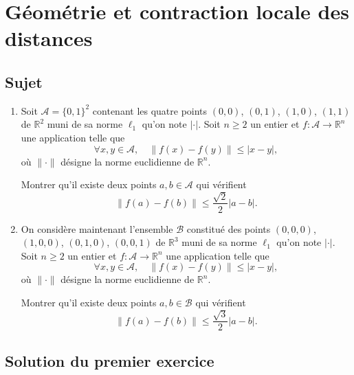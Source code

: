\chapter{Géométrie et contraction locale des distances}

\section{Sujet}

\begin{enumerate}
\item
Soit $\mathcal A = \{0,1\}^2$ contenant les quatre points $(0,0)$, $(0,1)$, $(1,0)$, $(1,1)$ de $\mathbb{R}^2$ muni de sa norme $\ell_1$ qu'on note $\lvert\cdot\rvert$. 
Soit $n\geqslant 2$ un entier et $f : \mathcal A \to \mathbb{R}^n$ une application telle que 
\[\forall x,y\in \mathcal A,\quad \lVert f(x) - f(y) \rVert \leqslant \lvert x - y \rvert,\]
où $\lVert \cdot \rVert$ désigne la norme euclidienne de $\mathbb{R}^n$.

Montrer qu'il existe deux points $a,b\in\mathcal A$ qui vérifient
\[\lVert f(a) - f(b)\rVert \leqslant \frac{\sqrt 2} 2 \lvert a - b\rvert.\]
\item 
On considère maintenant l'ensemble $\mathcal B$ constitué des points $(0,0,0)$, $(1,0,0)$, $(0,1,0)$, $(0,0,1)$ de $\mathbb{R}^3$ muni de sa norme $\ell_1$ qu'on note $\lvert\cdot\rvert$. Soit $n\geqslant 2$ un entier et $f : \mathcal A \to \mathbb{R}^n$ une application telle que 
\[\forall x,y\in\mathcal A, \quad \lVert f(x) - f(y) \rVert \leqslant \lvert x - y \rvert,\]
où $\lVert\cdot\rVert$ désigne la norme euclidienne de $\mathbb{R}^n$.

Montrer qu'il existe deux points $a,b\in\mathcal B$ qui vérifient 
\[\lVert f(a) - f(b)\rVert \leqslant \frac{\sqrt 3} 2 \lvert a - b\rvert.\]
\end{enumerate}

\section{Solution du premier exercice}

